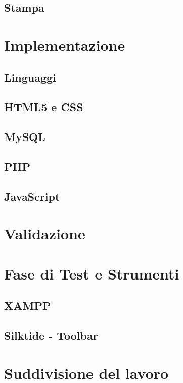 \documentclass[a4paper, dvipsnames, table]{article}
\begin{document}
	\subsection{Stampa}

\newpage
\section{Implementazione}%
	\subsection{Linguaggi}
		\subsection{HTML5 e CSS}
		\subsection{MySQL}
			
		\subsection{PHP}
		\subsection{JavaScript}

\newpage
\section{Validazione}%
	

\newpage
\section{Fase di Test e Strumenti}%
	\subsection{XAMPP}
		
	\subsection*{Silktide - Toolbar}
		
	
\newpage
\section{Suddivisione del lavoro}
\end{document}
